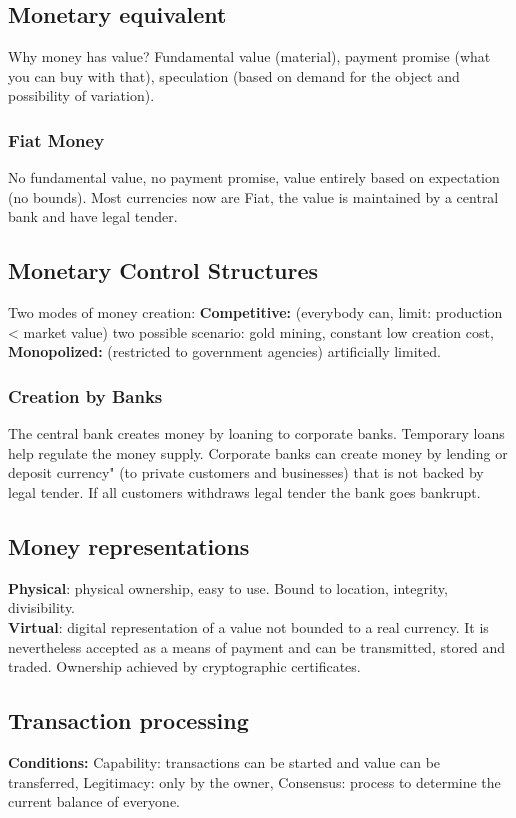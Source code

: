 \documentclass{article}
\begin{document}
\subsection{Monetary equivalent}
Why money has value? Fundamental value (material), payment promise (what you can buy with that), speculation (based on demand for the object and possibility of variation).\\
\subsubsection{Fiat Money}
No fundamental value, no payment promise, value entirely based on expectation (no bounds). Most currencies now are Fiat, the value is maintained by a central bank and have legal tender.
\subsection{Monetary Control Structures}
Two modes of money creation: \textbf{Competitive: } (everybody can, limit: production < market value) two possible scenario: gold mining, constant low creation cost, \textbf{Monopolized: } (restricted to government agencies) artificially limited.
\subsubsection{Creation by Banks}
The central bank creates money by loaning to corporate banks. Temporary loans help regulate the money supply. Corporate banks can create money by lending or deposit currency" (to private customers and businesses) that is not backed by legal tender. If all customers withdraws legal tender the bank goes bankrupt.
\subsection{Money representations}
\textbf{Physical}: physical ownership, easy to use. Bound to location, integrity, divisibility.\\
\textbf{Virtual}: digital representation of a value not bounded to a real currency. It is nevertheless accepted as a means of payment and can be transmitted, stored and traded. Ownership achieved by cryptographic certificates.\subsection{Transaction processing}
\textbf{Conditions:} Capability: transactions can be started and value can be transferred, Legitimacy: only by the owner, Consensus: process to determine the current balance of everyone.
\end{document}
